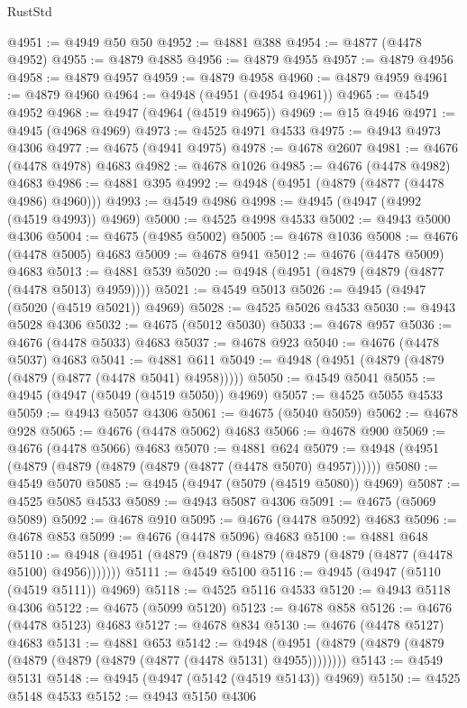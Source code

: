 \begin{lexlean}{RustStd}
\begin{coremodule}
{\begin{coremodule}
{{{{{{{{{{{{{{{{{{{{{{{{{{{{{{{{{{{{{{{{{{{{{{{{{{{{{{{{{{{{@4951 := @4949 @50 @50
@4952 := @4881 @388
@4954 := @4877 (@4478 @4952)
@4955 := @4879 @4885
@4956 := @4879 @4955
@4957 := @4879 @4956
@4958 := @4879 @4957
@4959 := @4879 @4958
@4960 := @4879 @4959
@4961 := @4879 @4960
@4964 := @4948 (@4951 (@4954 @4961))
@4965 := @4549 @4952
@4968 := @4947 (@4964 (@4519 @4965))
@4969 := @15 @4946
@4971 := @4945 (@4968 @4969)
@4973 := @4525 @4971 @4533
@4975 := @4943 @4973 @4306
@4977 := @4675 (@4941 @4975)
@4978 := @4678 @2607
@4981 := @4676 (@4478 @4978) @4683
@4982 := @4678 @1026
@4985 := @4676 (@4478 @4982) @4683
@4986 := @4881 @395
@4992 := @4948 (@4951 (@4879 (@4877 (@4478 @4986) @4960)))
@4993 := @4549 @4986
@4998 := @4945 (@4947 (@4992 (@4519 @4993)) @4969)
@5000 := @4525 @4998 @4533
@5002 := @4943 @5000 @4306
@5004 := @4675 (@4985 @5002)
@5005 := @4678 @1036
@5008 := @4676 (@4478 @5005) @4683
@5009 := @4678 @941
@5012 := @4676 (@4478 @5009) @4683
@5013 := @4881 @539
@5020 := @4948 (@4951 (@4879 (@4879 (@4877 (@4478 @5013) @4959))))
@5021 := @4549 @5013
@5026 := @4945 (@4947 (@5020 (@4519 @5021)) @4969)
@5028 := @4525 @5026 @4533
@5030 := @4943 @5028 @4306
@5032 := @4675 (@5012 @5030)
@5033 := @4678 @957
@5036 := @4676 (@4478 @5033) @4683
@5037 := @4678 @923
@5040 := @4676 (@4478 @5037) @4683
@5041 := @4881 @611
@5049 := @4948 (@4951 (@4879 (@4879 (@4879 (@4877 (@4478 @5041) @4958)))))
@5050 := @4549 @5041
@5055 := @4945 (@4947 (@5049 (@4519 @5050)) @4969)
@5057 := @4525 @5055 @4533
@5059 := @4943 @5057 @4306
@5061 := @4675 (@5040 @5059)
@5062 := @4678 @928
@5065 := @4676 (@4478 @5062) @4683
@5066 := @4678 @900
@5069 := @4676 (@4478 @5066) @4683
@5070 := @4881 @624
@5079 := @4948 (@4951 (@4879 (@4879 (@4879 (@4879 (@4877 (@4478 @5070) @4957))))))
@5080 := @4549 @5070
@5085 := @4945 (@4947 (@5079 (@4519 @5080)) @4969)
@5087 := @4525 @5085 @4533
@5089 := @4943 @5087 @4306
@5091 := @4675 (@5069 @5089)
@5092 := @4678 @910
@5095 := @4676 (@4478 @5092) @4683
@5096 := @4678 @853
@5099 := @4676 (@4478 @5096) @4683
@5100 := @4881 @648
@5110 := @4948 (@4951 (@4879 (@4879 (@4879 (@4879 (@4879 (@4877 (@4478 @5100) @4956)))))))
@5111 := @4549 @5100
@5116 := @4945 (@4947 (@5110 (@4519 @5111)) @4969)
@5118 := @4525 @5116 @4533
@5120 := @4943 @5118 @4306
@5122 := @4675 (@5099 @5120)
@5123 := @4678 @858
@5126 := @4676 (@4478 @5123) @4683
@5127 := @4678 @834
@5130 := @4676 (@4478 @5127) @4683
@5131 := @4881 @653
@5142 := @4948 (@4951 (@4879 (@4879 (@4879 (@4879 (@4879 (@4879 (@4877 (@4478 @5131) @4955))))))))
@5143 := @4549 @5131
@5148 := @4945 (@4947 (@5142 (@4519 @5143)) @4969)
@5150 := @4525 @5148 @4533
@5152 := @4943 @5150 @4306
}}}}}}}}}}}}}}}}}}}}}}}}}}}}}}}}}}}}}}}}}}}}}}}}}}}}}}}}}}}}
\end{coremodule}}
\end{coremodule}
\end{lexlean}
